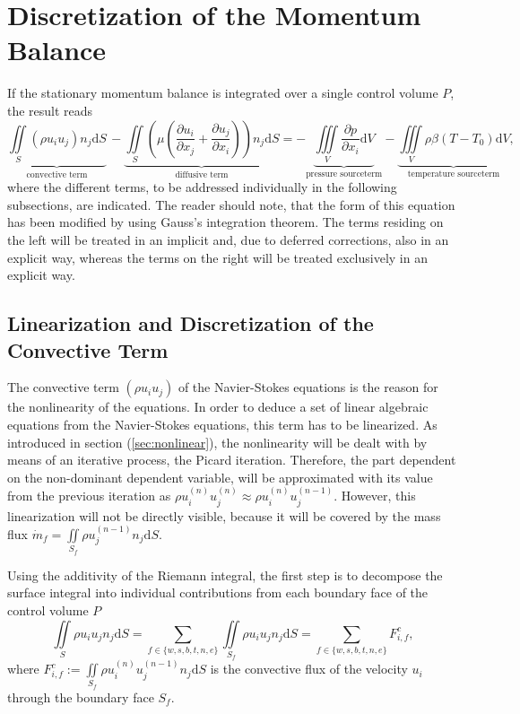 \section{Discretization of the Momentum Balance}
\label{sec:segdiscretization}

If the stationary momentum balance is integrated over a single control volume \(P\), the result reads
\begin{equation}
  \label{eq:semidiscrete}
  \underbrace{\iint\limits_S (\rho u_i u_j)n_j \mathrm{d}S}_{\text{convective term}}
  \,- \underbrace{\iint\limits_S \left(\mu \left( \frac{\partial u_i}{\partial x_j} + \frac{\partial u_j}{\partial x_i}\right)\right)n_j \mathrm{d}S}_{\text{diffusive term}}
  = - \underbrace{\iiint\limits_V \frac{\partial p}{\partial x_i} \mathrm{d}V}_{\text{pressure sourceterm}}
  - \underbrace{\iiint\limits_V \rho \beta \left(T - T_0\right) \mathrm{d}V}_{\text{temperature sourceterm}},
\end{equation}
where the different terms, to be addressed individually in the following subsections, are indicated. The reader should note, that the form of this equation has been modified by using Gauss's integration theorem. The terms residing on the left will be treated in an implicit and, due to deferred corrections, also in an explicit way, whereas the terms on the right will be treated exclusively in an explicit way.

\subsection{Linearization and Discretization of the Convective Term}
\label{sec:segconvective}

The convective term \(\left( \rho u_i u_j \right)\) of the Navier-Stokes equations is the reason for the nonlinearity of the equations. In order to deduce a set of linear algebraic equations from the Navier-Stokes equations, this term has to be linearized. As introduced in section (\ref{sec:nonlinear}), the nonlinearity will be dealt with by means of an iterative process, the Picard iteration. Therefore, the part dependent on the non-dominant dependent variable, will be approximated with its value from the previous iteration as \( \rho u_i^{(n)} u_j^{(n)} \approx \rho u_i^{(n)} u_j^{(n-1)} \). However, this linearization will not be directly visible, because it will be covered by the mass flux \(\textstyle \dot{m}_f = \iint\limits_{S_f} \rho u_j^{(n-1)} n_j \mathrm{d}S \). 

Using the additivity of the Riemann integral, the first step is to decompose the surface integral into individual contributions from each boundary face of the control volume \(P\)
\begin{displaymath}
  \iint\limits_S \rho u_i u_jn_j \mathrm{d}S
  = \sum_{f \in \{w,s,b,t,n,e\}} \iint\limits_{S_f}\rho u_{i} u_{j} n_{j} \mathrm{d}S
  = \sum_{f \in \{w,s,b,t,n,e\}} F_{i,f}^{c},
\end{displaymath}
where \(\textstyle F_{i,f}^c := \iint\limits_{S_f} \rho u_{i}^{(n)} u_{j}^{(n-1)} n_{j} \mathrm{d}S \) is the convective flux of the velocity \(u_i\) through the boundary face \(S_f\). 
      

